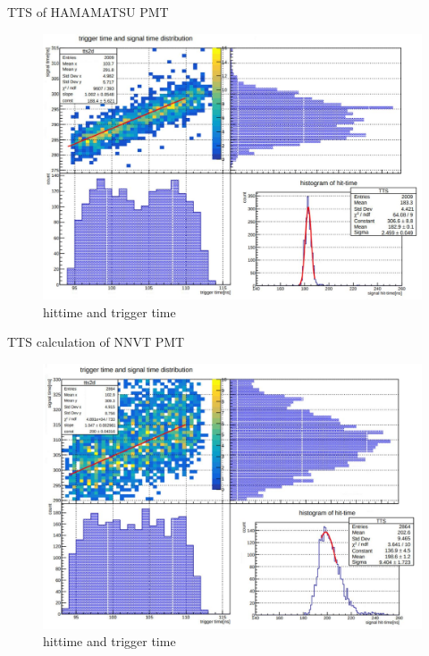 \documentclass[11pt,compress,xcolor=x11names,UTF8]{beamer}
\begin{document}
\begin{frame}{TTS of HAMAMATSU PMT}
\begin{figure}
\centering
\includegraphics[width=.8\textwidth]{figures/hamtts.JPG} %
\caption{hittime and trigger time}
\end{figure}
\end{frame}
\begin{frame}{TTS calculation of NNVT PMT}
\begin{figure}
\centering
\includegraphics[width=.8\textwidth]{figures/mcptts.JPG} %
\caption{hittime and trigger time}
\end{figure}
\end{frame}
\end{document}

